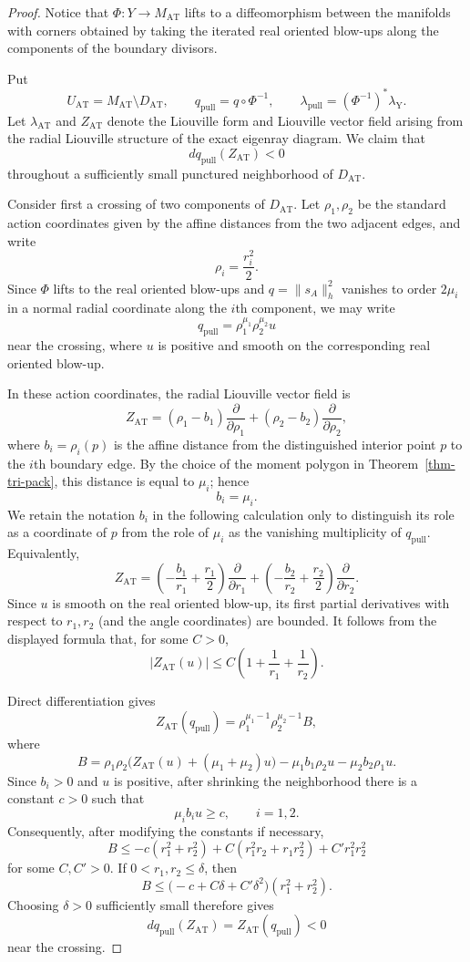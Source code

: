 \documentclass[11pt, reqno]{amsart}
\theoremstyle{definition}
\begin{document}
\begin{proof}
Notice that $\Phi\colon Y\to M_{\mathrm{AT}}$ lifts to a
diffeomorphism between the manifolds with corners obtained by taking
the iterated real oriented blow-ups along the components of the
boundary divisors. 

Put
\[
U_{\mathrm{AT}}
=
M_{\mathrm{AT}}\setminus D_{\mathrm{AT}},
\qquad
q_{\mathrm{pull}}
=
q\circ\Phi^{-1},
\qquad
\lambda_{\mathrm{pull}}
=
(\Phi^{-1})^*\lambda_{\mathrm{Y}}.
\]
Let $\lambda_{\mathrm{AT}}$ and $Z_{\mathrm{AT}}$ denote the
Liouville form and Liouville vector field arising from the radial
Liouville structure of the exact eigenray diagram. We claim that
\[
dq_{\mathrm{pull}}(Z_{\mathrm{AT}})<0
\]
throughout a sufficiently small punctured neighborhood of
$D_{\mathrm{AT}}$.

Consider first a crossing of two components of $D_{\mathrm{AT}}$.
Let $\rho_1,\rho_2$ be the standard action coordinates given by the
affine distances from the two adjacent edges, and write
\[
\rho_i=\frac{r_i^2}{2}.
\]
Since $\Phi$ lifts to the real oriented blow-ups and
$q=\lVert s_A\rVert_h^2$ vanishes to order $2\mu_i$ in a normal
radial coordinate along the $i$th component, we may write
\[
q_{\mathrm{pull}}
=
\rho_1^{\mu_1}\rho_2^{\mu_2}u
\]
near the crossing, where $u$ is positive and smooth on the
corresponding real oriented blow-up.

In these action coordinates, the radial Liouville vector field is
\[
Z_{\mathrm{AT}}
=
(\rho_1-b_1)\frac{\partial}{\partial\rho_1}
+
(\rho_2-b_2)\frac{\partial}{\partial\rho_2},
\]
where
\(
b_i=\rho_i(p)
\)
is the affine distance from the distinguished interior point $p$ to
the $i$th boundary edge. By the choice of the moment polygon in
Theorem~\ref{thm-tri-pack}, this distance is equal to $\mu_i$; hence
\[
b_i=\mu_i.
\]
We retain the notation $b_i$ in the following calculation only to
distinguish its role as a coordinate of $p$ from the role of $\mu_i$
as the vanishing multiplicity of $q_{\mathrm{pull}}$. Equivalently,
\[
Z_{\mathrm{AT}}
=
\left(-\frac{b_1}{r_1}+\frac{r_1}{2}\right)
\frac{\partial}{\partial r_1}
+
\left(-\frac{b_2}{r_2}+\frac{r_2}{2}\right)
\frac{\partial}{\partial r_2}.
\]
Since $u$ is smooth on the real oriented
blow-up, its first partial derivatives with respect to $r_1,r_2$ (and the angle coordinates) are bounded. It follows from the
displayed formula that, for some $C>0$,
\[
\left|Z_{\mathrm{AT}}(u)\right|
\leq
C\left(1+\frac{1}{r_1}+\frac{1}{r_2}\right).
\]

Direct differentiation gives
\[
Z_{\mathrm{AT}}(q_{\mathrm{pull}})
=
\rho_1^{\mu_1-1}\rho_2^{\mu_2-1}B,
\]
where
\[
B
=
\rho_1\rho_2
\bigl(Z_{\mathrm{AT}}(u)+(\mu_1+\mu_2)u\bigr)
-\mu_1b_1\rho_2u-\mu_2b_2\rho_1u.
\]
Since $b_i>0$ and $u$ is positive, after shrinking the neighborhood
there is a constant $c>0$ such that
\[
\mu_i b_i u\geq c,
\qquad i=1,2.
\]
Consequently, after modifying the constants if necessary,
\[
B
\leq
-c(r_1^2+r_2^2)
+
C(r_1^2r_2+r_1r_2^2)
+
C'r_1^2r_2^2
\]
for some $C,C'>0$. If $0<r_1,r_2\leq\delta$, then
\[
B
\leq
\bigl(-c+C\delta+C'\delta^2\bigr)(r_1^2+r_2^2).
\]
Choosing $\delta>0$ sufficiently small therefore gives
\[
dq_{\mathrm{pull}}(Z_{\mathrm{AT}})
=
Z_{\mathrm{AT}}(q_{\mathrm{pull}})<0
\]
near the crossing.


\end{proof}
\end{document}
